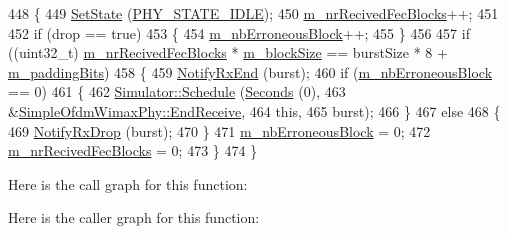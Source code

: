 \begin{DoxyCode}
448 \{
449   \hyperlink{classns3_1_1WimaxPhy_abb3acfe9ecda0e5a44275fdb3e4ccf5c}{SetState} (\hyperlink{classns3_1_1WimaxPhy_a9cc75c9e84f88fc3064bba918eee1f78a4c52321bb9dfcc8d3f50777a15b4c5ef}{PHY\_STATE\_IDLE});
450   \hyperlink{classns3_1_1SimpleOfdmWimaxPhy_a5f5e1bd7475a9cbb57bf56d30b91c651}{m\_nrRecivedFecBlocks}++;
451 
452   \textcolor{keywordflow}{if} (drop == \textcolor{keyword}{true})
453     \{
454       \hyperlink{classns3_1_1SimpleOfdmWimaxPhy_a37b3fc2bee36032b02ca5a9eac9974e9}{m\_nbErroneousBlock}++;
455     \}
456 
457   \textcolor{keywordflow}{if} ((uint32\_t) \hyperlink{classns3_1_1SimpleOfdmWimaxPhy_a5f5e1bd7475a9cbb57bf56d30b91c651}{m\_nrRecivedFecBlocks} * \hyperlink{classns3_1_1SimpleOfdmWimaxPhy_a3f1a95a822adee3f7ceb2bb5a63db5c2}{m\_blockSize} == burstSize * 8 + 
      \hyperlink{classns3_1_1SimpleOfdmWimaxPhy_ae06e32aa0737ae886a97e364b0c56de1}{m\_paddingBits})
458     \{
459       \hyperlink{classns3_1_1SimpleOfdmWimaxPhy_a0788de9218dda54087cbec6977d6d3eb}{NotifyRxEnd} (burst);
460       \textcolor{keywordflow}{if} (\hyperlink{classns3_1_1SimpleOfdmWimaxPhy_a37b3fc2bee36032b02ca5a9eac9974e9}{m\_nbErroneousBlock} == 0)
461         \{
462           \hyperlink{classns3_1_1Simulator_a671882c894a08af4a5e91181bf1eec13}{Simulator::Schedule} (\hyperlink{group__timecivil_ga33c34b816f8ff6628e33d5c8e9713b9e}{Seconds} (0),
463                                &\hyperlink{classns3_1_1SimpleOfdmWimaxPhy_a17ca55242f086cdaacdbe55b571a8f37}{SimpleOfdmWimaxPhy::EndReceive},
464                                \textcolor{keyword}{this},
465                                burst);
466         \}
467       \textcolor{keywordflow}{else}
468         \{
469           \hyperlink{classns3_1_1SimpleOfdmWimaxPhy_a529e1a876bf8a7edaa0d9137b0f0a997}{NotifyRxDrop} (burst);
470         \}
471       \hyperlink{classns3_1_1SimpleOfdmWimaxPhy_a37b3fc2bee36032b02ca5a9eac9974e9}{m\_nbErroneousBlock} = 0;
472       \hyperlink{classns3_1_1SimpleOfdmWimaxPhy_a5f5e1bd7475a9cbb57bf56d30b91c651}{m\_nrRecivedFecBlocks} = 0;
473     \}
474 \}
\end{DoxyCode}


Here is the call graph for this function\+:




Here is the caller graph for this function\+:


